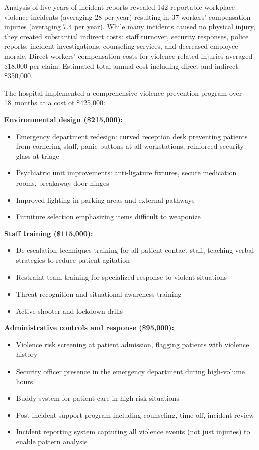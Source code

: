 \documentclass[11pt,openany]{book}
\providecommand{\tightlist}{\setlength{\itemsep}{0pt}\setlength{\parskip}{0pt}}
\begin{document}
Analysis of five years of incident reports revealed 142 reportable workplace
violence incidents (averaging 28 per year) resulting in 37 workers'
compensation injuries (averaging 7.4 per year). While many incidents caused no
physical injury, they created substantial indirect costs: staff turnover,
security responses, police reports, incident investigations, counseling
services, and decreased employee morale. Direct workers' compensation costs
for violence-related injuries averaged \$18{,}000 per claim. Estimated total
annual cost including direct and indirect: \$350{,}000.

The hospital implemented a comprehensive violence prevention program over
18~months at a cost of \$425{,}000:

\textbf{Environmental design (\$215{,}000):}
\begin{itemize}\tightlist
  \item Emergency department redesign: curved reception desk preventing
        patients from cornering staff, panic buttons at all workstations,
        reinforced security glass at triage
  \item Psychiatric unit improvements: anti-ligature fixtures, secure
        medication rooms, breakaway door hinges
  \item Improved lighting in parking areas and external pathways
  \item Furniture selection emphasizing items difficult to weaponize
\end{itemize}

\textbf{Staff training (\$115{,}000):}
\begin{itemize}\tightlist
  \item De-escalation techniques training for all patient-contact staff,
        teaching verbal strategies to reduce patient agitation
  \item Restraint team training for specialized response to violent situations
  \item Threat recognition and situational awareness training
  \item Active shooter and lockdown drills
\end{itemize}

\textbf{Administrative controls and response (\$95{,}000):}
\begin{itemize}\tightlist
  \item Violence risk screening at patient admission, flagging patients with
        violence history
  \item Security officer presence in the emergency department during
        high-volume hours
  \item Buddy system for patient care in high-risk situations
  \item Post-incident support program including counseling, time off, incident
        review
  \item Incident reporting system capturing all violence events (not just
        injuries) to enable pattern analysis
\end{itemize}
\end{document}

